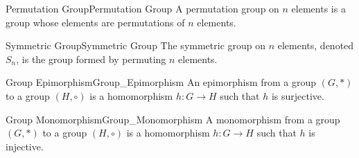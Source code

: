         \begin{fdefinition}{Permutation Group}{Permutation Group}
            A permutation group on $n$ elements is a group whose elements are
            permutations of $n$ elements.
        \end{fdefinition}
        \begin{fdefinition}{Symmetric Group}{Symmetric Group}
            The symmetric group on $n$ elements, denoted $S_{n}$, is the group
            formed by permuting $n$ elements.
        \end{fdefinition}
        \begin{fdefinition}{Group Epimorphism}{Group_Epimorphism}
            An epimorphism from a group $(G,*)$ to a group $(H,\circ)$ is a
            homomorphism $h:{G}\rightarrow{H}$ such that $h$ is surjective.
        \end{fdefinition}
        \begin{fdefinition}{Group Monomorphism}{Group_Monomorphism}
            A monomorphism from a group $(G,*)$ to a group $(H,\circ)$ is a
            homomorphism $h:{G}\rightarrow{H}$ such that $h$ is injective.
        \end{fdefinition}